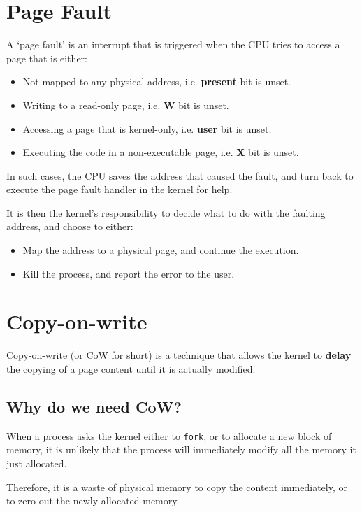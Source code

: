 \section{Page Fault}

A `page fault' is an interrupt that is triggered when the CPU tries to access a
page that is either:

\begin{itemize}
    \item Not mapped to any physical address, i.e. \textbf{present} bit is unset.
    \item Writing to a read-only page, i.e. \textbf{W} bit is unset.
    \item Accessing a page that is kernel-only, i.e. \textbf{user} bit is unset.
    \item Executing the code in a non-executable page, i.e. \textbf{X} bit is unset.
\end{itemize}

In such cases, the CPU saves the address that caused the fault, and turn back
to execute the page fault handler in the kernel for help.

It is then the kernel's responsibility to decide what to do with the faulting
address, and choose to either:

\begin{itemize}
    \item Map the address to a physical page, and continue the execution.
    \item Kill the process, and report the error to the user.
\end{itemize}

\section{Copy-on-write}

Copy-on-write (or CoW for short) is a technique that allows the kernel to
\textbf{delay} the copying of a page content until it is actually modified.

\subsection{Why do we need CoW?}

When a process asks the kernel either to \texttt{fork}, or to allocate
a new block of memory, it is unlikely that the process will immediately
modify all the memory it just allocated.

Therefore, it is a waste of physical memory to copy the content
immediately, or to zero out the newly allocated memory.


